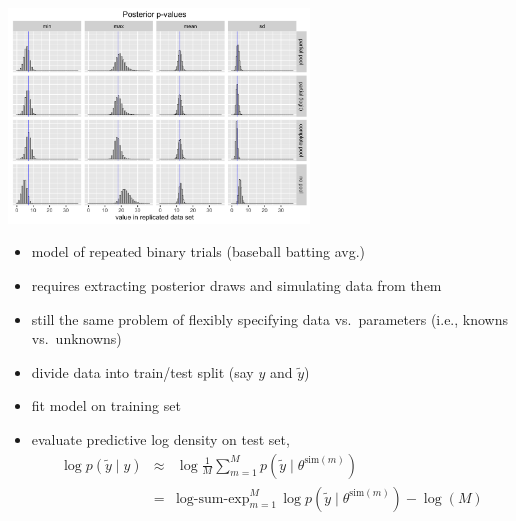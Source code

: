 \documentclass[10pt]{report}
\newcommand{\simdraw}[2]{#1^{\textrm{sim}(#2)}}
\begin{document}
\begin{center}
\vspace*{-10pt}
\includegraphics[width=0.6\textwidth]{img/ppc-binary-trials.png}
\vspace*{-10pt}
\end{center}
\begin{itemize}
\item model of repeated binary trials (baseball batting avg.)
\end{itemize}

\begin{itemize}
\item requires extracting posterior draws and simulating data from
  them
\item still the same problem of flexibly specifying data
  vs.\ parameters (i.e., knowns vs.\ unknowns)
\end{itemize}

\begin{itemize}
\item divide data into train/test split (say $y$ and $\widetilde{y}$)
\item fit model on training set
\item evaluate predictive log density on test set,
  \begin{eqnarray*}
    \log p(\tilde{y} \mid y)
    & \approx & \log \frac{1}{M} \sum_{m=1}^M p(\tilde{y} \mid \simdraw{\theta}{m})
    \\[4pt]
    & = & \textrm{log-sum-exp}_{m=1}^M \, \log p(\tilde{y} \mid
          \simdraw{\theta}{m})
          - \log(M)
  \end{eqnarray*}
\end{itemize}
\end{document}
